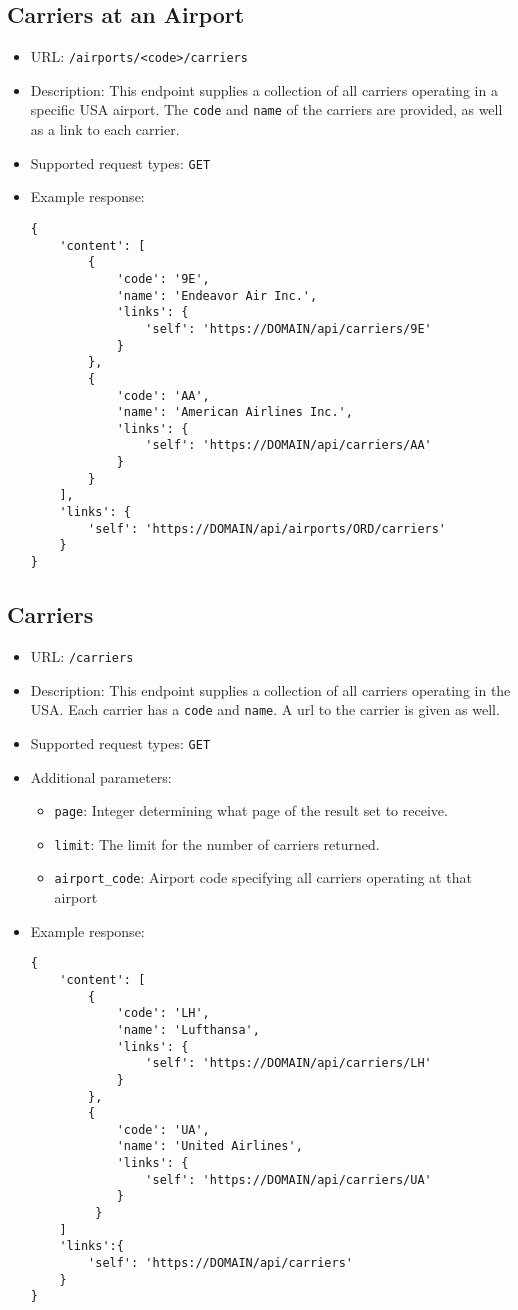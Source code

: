 \documentclass{article}
\begin{document}
	\subsection{Carriers at an Airport}
	    \begin{itemize}
			\item URL: \texttt{/airports/<code>/carriers}
			\item Description: This endpoint supplies a collection of all carriers operating in a specific USA airport. The \texttt{code} and \texttt{name} of the carriers are provided, as well as a link to each carrier.
			\item Supported request types: \texttt{GET}
			\item Example response:
			\begin{lstlisting}
{
    'content': [
        {
            'code': '9E',
            'name': 'Endeavor Air Inc.',
            'links': {
                'self': 'https://DOMAIN/api/carriers/9E'
            }
        },
        {
            'code': 'AA',
            'name': 'American Airlines Inc.',
            'links': {
                'self': 'https://DOMAIN/api/carriers/AA'
            }
        }
    ],
    'links': {
        'self': 'https://DOMAIN/api/airports/ORD/carriers'
    }
}

			\end{lstlisting}
		\end{itemize}
		
    \subsection{Carriers}
		\begin{itemize}
		\item URL: \texttt{/carriers}
		\item Description: This endpoint supplies a collection of all carriers operating in the USA. Each carrier has a \texttt{code} and \texttt{name}. A url to the carrier is given as well.
		\item Supported request types: \texttt{GET}
		\item Additional parameters:
			\begin{itemize}
				\item \texttt{page}: Integer determining what page of the result set to receive.
				\item \texttt{limit}: The limit for the number of carriers returned.
				\item \texttt{airport\_code}: Airport code specifying all carriers operating at that airport
			\end{itemize}
		\item Example response:
		\begin{lstlisting}
{
    'content': [
        {
        	'code': 'LH',
        	'name': 'Lufthansa',
        	'links': {
        		'self': 'https://DOMAIN/api/carriers/LH'
        	}
        },
	    {
    		'code': 'UA',
    		'name': 'United Airlines',
    		'links': {
    			'self': 'https://DOMAIN/api/carriers/UA'
    		}
         }
    ]
    'links':{
        'self': 'https://DOMAIN/api/carriers'
    }
}
			\end{lstlisting}
		\end{itemize}
		
\end{document}
